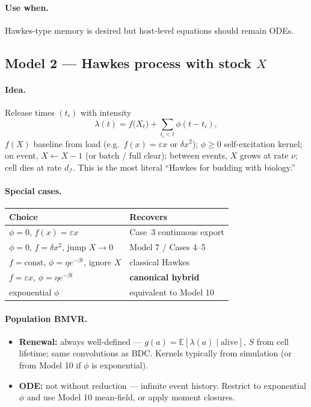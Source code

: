 \documentclass[11pt,a4paper]{article}
\newcommand{\E}{\mathbb{E}}
\newcommand{\Icell}{\mathcal{I}}
\theoremstyle{plain}
\theoremstyle{definition}
\theoremstyle{remark}
\begin{document}
\paragraph{Use when.}
Hawkes-type memory is desired but host-level equations should remain ODEs.

\subsection{Model 2 --- Hawkes process with stock $X$}

\paragraph{Idea.}
Release times $(t_i)$ with intensity
\begin{equation}
\label{eq:m2-hawkes}
\lambda(t)
= f\bigl(X_t\bigr)
+ \sum_{t_i<t}\phi(t-t_i),
\end{equation}
$f(X)$ baseline from load (e.g.\ $f(x)=\varepsilon x$ or $\delta x^2$); $\phi\ge 0$
self-excitation kernel; on event, $X\leftarrow X-1$ (or batch / full clear);
between events, $X$ grows at rate $\nu$; cell dies at rate $d_{\Icell}$.
This is the most literal ``Hawkes for budding with biology.''

\paragraph{Special cases.}
\begin{center}
\renewcommand{\arraystretch}{1.15}
\begin{tabular}{@{}ll@{}}
\toprule
Choice & Recovers \\
\midrule
$\phi=0$, $f(x)=\varepsilon x$ & Case~3 continuous export \\
$\phi=0$, $f=\delta x^2$, jump $X\to 0$ & Model 7 / Cases 4--5 \\
$f=\mathrm{const}$, $\phi=\eta e^{-\beta t}$, ignore $X$ & classical Hawkes \\
$f=\varepsilon x$, $\phi=\eta e^{-\beta t}$ & \textbf{canonical hybrid} \\
exponential $\phi$ & equivalent to Model 10 \\
\bottomrule
\end{tabular}
\end{center}

\paragraph{Population BMVR.}
\begin{itemize}
\item \textbf{Renewal:} always well-defined ---
$g(a)=\E[\lambda(a)\mid\mathrm{alive}]$, $S$ from cell lifetime; same
convolutions as BDC. Kernels typically from simulation (or from Model 10 if
$\phi$ is exponential).
\item \textbf{ODE:} not without reduction --- infinite event history. Restrict
to exponential $\phi$ and use Model 10 mean-field, or apply moment closures.
\end{itemize}
\end{document}

